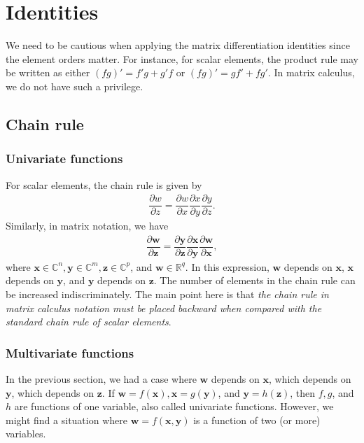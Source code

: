 \documentclass{article}
\begin{document}
\section{Identities}

We need to be cautious when applying the matrix differentiation identities since the element orders matter. For instance, for scalar elements, the product rule may be written as either \((fg)' = f'g + g'f\) or \((fg)' = g f' + f g'\). In matrix calculus, we do not have such a privilege.

\subsection{Chain rule}
\subsubsection{Univariate functions}
For scalar elements, the chain rule is given by
\begin{align}
    \dfrac{\partial w}{\partial z} = \dfrac{\partial w}{\partial x} \dfrac{\partial x}{\partial y} \dfrac{\partial y}{\partial z}.
\end{align}
Similarly, in matrix notation, we have
\begin{align}
    \label{eq:chain-1inter}
    \dfrac{\partial \mathbf{w}}{\partial \mathbf{z}} = \dfrac{\partial \mathbf{y}}{\partial \mathbf{z}} \dfrac{\partial \mathbf{x}}{\partial \mathbf{y}} \dfrac{\partial \mathbf{w}}{\partial \mathbf{x}},
\end{align}
where \(\mathbf{x} \in \mathbb{C}^{n}, \mathbf{y} \in \mathbb{C}^{m}, \mathbf{z} \in \mathbb{C}^{p}\), and \(\mathbf{w} \in \mathbb{R}^q\). In this expression, \(\mathbf{w}\) depends on \(\mathbf{x}\), \(\mathbf{x}\) depends on \(\mathbf{y}\), and \(\mathbf{y}\) depends on \(\mathbf{z}\). The number of elements in the chain rule can be increased indiscriminately. The main point here is that \emph{the chain rule in matrix calculus notation must be placed backward when compared with the standard chain rule of scalar elements}.

\subsubsection{Multivariate functions}

In the previous section, we had a case where \(\mathbf{w}\) depends on \(\mathbf{x}\), which depends on \(\mathbf{y}\), which depends on \(\mathbf{z}\). If \(\mathbf{w} = f(\mathbf{x}), \mathbf{x} = g(\mathbf{y})\), and \(\mathbf{y} = h(\mathbf{z})\), then \(f, g\), and \(h\) are functions of one variable, also called univariate functions. However, we might find a situation where \(\mathbf{w} = f(\mathbf{x}, \mathbf{y})\) is a function of two (or more) variables.
\end{document}
